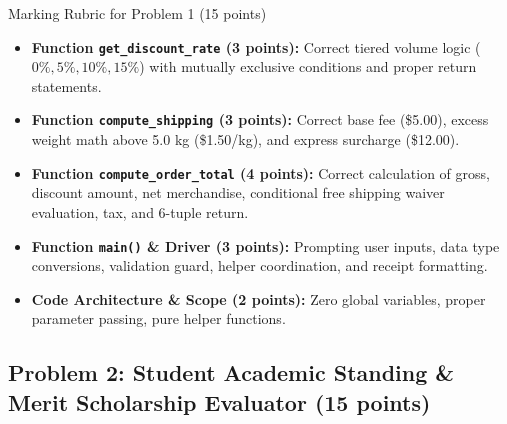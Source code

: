\documentclass[11pt,a4paper]{article}
\begin{document}
\vspace{0.12cm}
\begin{solbox}[top=1.5mm, bottom=1.5mm]{Marking Rubric for Problem 1 (15 points)}
\small
\begin{itemize}[leftmargin=2em, itemsep=0.5pt]
  \item \textbf{Function \texttt{get\_discount\_rate} (3 points):} Correct tiered volume logic ($0\%, 5\%, 10\%, 15\%$) with mutually exclusive conditions and proper return statements.
  \item \textbf{Function \texttt{compute\_shipping} (3 points):} Correct base fee (\$5.00), excess weight math above 5.0 kg (\$1.50/kg), and express surcharge (\$12.00).
  \item \textbf{Function \texttt{compute\_order\_total} (4 points):} Correct calculation of gross, discount amount, net merchandise, conditional free shipping waiver evaluation, tax, and 6-tuple return.
  \item \textbf{Function \texttt{main()} \& Driver (3 points):} Prompting user inputs, data type conversions, validation guard, helper coordination, and receipt formatting.
  \item \textbf{Code Architecture \& Scope (2 points):} Zero global variables, proper parameter passing, pure helper functions.
\end{itemize}
\end{solbox}

\newpage

\subsection*{Problem 2: Student Academic Standing \& Merit Scholarship Evaluator (15 points)}
\end{document}
